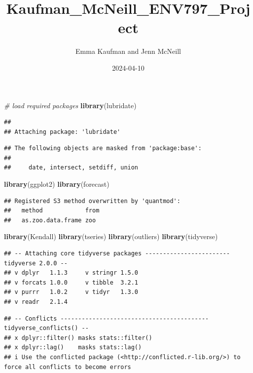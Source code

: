 \documentclass[
]{article}
\title{Kaufman\_McNeill\_ENV797\_Project}
\author{Emma Kaufman and Jenn McNeill}
\date{2024-04-10}
\newenvironment{Shaded}{\begin{snugshade}}{\end{snugshade}}
\newcommand{\CommentTok}[1]{\textcolor[rgb]{0.56,0.35,0.01}{\textit{#1}}}
\newcommand{\FunctionTok}[1]{\textcolor[rgb]{0.13,0.29,0.53}{\textbf{#1}}}
\newcommand{\NormalTok}[1]{#1}
\begin{document}
\maketitle

\begin{Shaded}
\begin{Highlighting}[]
\CommentTok{\# load required packages}
\FunctionTok{library}\NormalTok{(lubridate)}
\end{Highlighting}
\end{Shaded}

\begin{verbatim}
## 
## Attaching package: 'lubridate'
\end{verbatim}

\begin{verbatim}
## The following objects are masked from 'package:base':
## 
##     date, intersect, setdiff, union
\end{verbatim}

\begin{Shaded}
\begin{Highlighting}[]
\FunctionTok{library}\NormalTok{(ggplot2)}
\FunctionTok{library}\NormalTok{(forecast)  }
\end{Highlighting}
\end{Shaded}

\begin{verbatim}
## Registered S3 method overwritten by 'quantmod':
##   method            from
##   as.zoo.data.frame zoo
\end{verbatim}

\begin{Shaded}
\begin{Highlighting}[]
\FunctionTok{library}\NormalTok{(Kendall)}
\FunctionTok{library}\NormalTok{(tseries)}
\FunctionTok{library}\NormalTok{(outliers)}
\FunctionTok{library}\NormalTok{(tidyverse)}
\end{Highlighting}
\end{Shaded}

\begin{verbatim}
## -- Attaching core tidyverse packages ------------------------ tidyverse 2.0.0 --
## v dplyr   1.1.3     v stringr 1.5.0
## v forcats 1.0.0     v tibble  3.2.1
## v purrr   1.0.2     v tidyr   1.3.0
## v readr   2.1.4
\end{verbatim}

\begin{verbatim}
## -- Conflicts ------------------------------------------ tidyverse_conflicts() --
## x dplyr::filter() masks stats::filter()
## x dplyr::lag()    masks stats::lag()
## i Use the conflicted package (<http://conflicted.r-lib.org/>) to force all conflicts to become errors
\end{verbatim}
\end{document}
